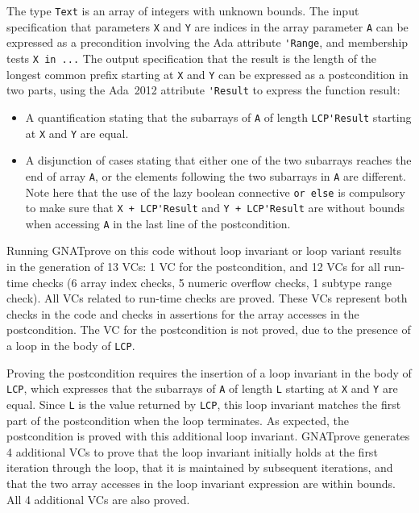 \documentclass[sttt,draft]{svjour}
\newcommand{\gnatprove}{GNATprove\xspace}
\newcommand{\adatwtw}{Ada~2012\xspace}
\begin{document}
The type \verb|Text| is an array of integers with unknown bounds. The input
specification that parameters \verb|X| and \verb|Y| are indices in the array
parameter \verb|A| can be expressed as a precondition involving the Ada
attribute \verb|'Range|, and membership tests \verb|X in ...| The output
specification that the result is the length of the longest common prefix
starting at \verb|X| and \verb|Y| can be expressed as a postcondition in two
parts, using the \adatwtw attribute \verb|'Result| to express the function
result:
\begin{itemize}
\item A quantification stating that the subarrays of \verb|A| of length
  \verb|LCP'Result| starting at \verb|X| and \verb|Y| are equal.
\item A disjunction of cases stating that either one of the two subarrays
  reaches the end of array \verb|A|, or the elements following the two
  subarrays in \verb|A| are different. Note here that the use of the lazy
  boolean connective \verb|or else| is compulsory to make sure that
  \verb|X + LCP'Result| and \verb|Y + LCP'Result| are without bounds when
  accessing \verb|A| in the last line of the postcondition.
\end{itemize}

Running \gnatprove on this code without loop invariant or loop variant results
in the generation of 13 VCs: 1 VC for the postcondition, and 12 VCs for all
run-time checks (6 array index checks, 5 numeric overflow checks, 1 subtype
range check). All VCs related to run-time checks are proved. These VCs
represent both checks in the code and checks in assertions for the array
accesses in the postcondition. The VC for the postcondition is not proved, due
to the presence of a loop in the body of \verb|LCP|.

Proving the postcondition requires the insertion of a loop invariant in the
body of \verb|LCP|, which expresses that the subarrays of \verb|A| of length
\verb|L| starting at \verb|X| and \verb|Y| are equal. Since \verb|L| is the
value returned by \verb|LCP|, this loop invariant matches the first part of the
postcondition when the loop terminates. As expected, the postcondition is
proved with this additional loop invariant. \gnatprove generates 4 additional
VCs to prove that the loop invariant initially holds at the first iteration
through the loop, that it is maintained by subsequent iterations, and that the
two array accesses in the loop invariant expression are within bounds. All 4
additional VCs are also proved.
\end{document}
